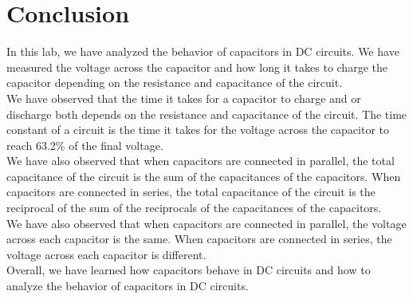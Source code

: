\documentclass[a4paper, 10pt]{article}
\begin{document}
	\pagebreak
	\section{Conclusion}
		In this lab, we have analyzed the behavior of capacitors in DC circuits. 
		We have measured the voltage across the capacitor and how long it takes to charge the capacitor depending on the resistance and capacitance of the circuit.\\

		We have observed that the time it takes for a capacitor to charge and or discharge both depends on the resistance and capacitance of the circuit. 
		The time constant of a circuit is the time it takes for the voltage across the capacitor to reach 63.2\% of the final voltage.\\

		We have also observed that when capacitors are connected in parallel, the total capacitance of the circuit is the sum of the capacitances of the capacitors. 
		When capacitors are connected in series, the total capacitance of the circuit is the reciprocal of the sum of the reciprocals of the capacitances of the capacitors.\\

		We have also observed that when capacitors are connected in parallel, the voltage across each capacitor is the same. 
		When capacitors are connected in series, the voltage across each capacitor is different.\\

		Overall, we have learned how capacitors behave in DC circuits and how to analyze the behavior of capacitors in DC circuits.
\end{document}

